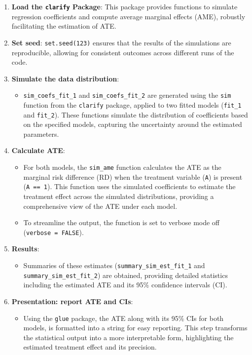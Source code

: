 \documentclass[
  singlecolumn]{article}
\providecommand{\tightlist}{%
  \setlength{\itemsep}{0pt}\setlength{\parskip}{0pt}}\usepackage{longtable,booktabs,array}
\begin{document}
\begin{enumerate}
\def\labelenumi{\arabic{enumi}.}
\item
  \textbf{Load the \texttt{clarify} Package}: This package provides
  functions to simulate regression coefficients and compute average
  marginal effects (AME), robustly facilitating the estimation of ATE.
\item
  \textbf{Set seed}: \texttt{set.seed(123)} ensures that the results of
  the simulations are reproducible, allowing for consistent outcomes
  across different runs of the code.
\item
  \textbf{Simulate the data distribution}:

  \begin{itemize}
  \tightlist
  \item
    \texttt{sim\_coefs\_fit\_1} and \texttt{sim\_coefs\_fit\_2} are
    generated using the \texttt{sim} function from the \texttt{clarify}
    package, applied to two fitted models (\texttt{fit\_1} and
    \texttt{fit\_2}). These functions simulate the distribution of
    coefficients based on the specified models, capturing the
    uncertainty around the estimated parameters.
  \end{itemize}
\item
  \textbf{Calculate ATE}:

  \begin{itemize}
  \tightlist
  \item
    For both models, the \texttt{sim\_ame} function calculates the ATE
    as the marginal risk difference (RD) when the treatment variable
    (\texttt{A}) is present (\texttt{A\ ==\ 1}). This function uses the
    simulated coefficients to estimate the treatment effect across the
    simulated distributions, providing a comprehensive view of the ATE
    under each model.
  \item
    To streamline the output, the function is set to verbose mode off
    (\texttt{verbose\ =\ FALSE}).
  \end{itemize}
\item
  \textbf{Results}:

  \begin{itemize}
  \tightlist
  \item
    Summaries of these estimates (\texttt{summary\_sim\_est\_fit\_1} and
    \texttt{summary\_sim\_est\_fit\_2}) are obtained, providing detailed
    statistics including the estimated ATE and its 95\% confidence
    intervals (CI).
  \end{itemize}
\item
  \textbf{Presentation: report ATE and CIs}:

  \begin{itemize}
  \tightlist
  \item
    Using the \texttt{glue} package, the ATE along with its 95\% CIs for
    both models, is formatted into a string for easy reporting. This
    step transforms the statistical output into a more interpretable
    form, highlighting the estimated treatment effect and its precision.
  \end{itemize}
\end{enumerate}
\end{document}
